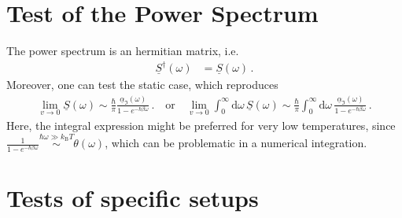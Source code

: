 \documentclass[11pt]{article}
\newcommand{\vv}[1]{\mathbf{#1}}
\newcommand{\dd}[0]{\mathrm{d}}
\begin{document}
\section{Test of the Power Spectrum}
The power spectrum is an hermitian matrix, i.e.
\begin{align}
\underline{S}^\dagger(\omega) &= \underline{S}(\omega)\,.
\end{align}
Moreover, one can test the static case, which reproduces
\begin{align}
  \lim_{v\to0}\underline{S}(\omega) \sim \frac{\hbar}{\pi}\frac{\underline{\alpha}_\Im(\omega)}{1-e^{-\hbar\beta\omega}}\,.
\quad\text{or} \quad
  \lim_{v\to0}\int_0^\infty\dd\omega\,\underline{S}(\omega) \sim \frac{\hbar}{\pi}\int_0^\infty\dd\omega\,\frac{\underline{\alpha}_\Im(\omega)}{1-e^{-\hbar\beta\omega}}\,.
\end{align}
Here, the integral expression might be preferred for very low temperatures, since $\frac{1}{1-e^{-\hbar\beta\omega}}\stackrel{\hbar\omega \gg k_\mathrm{B}T}\sim \theta(\omega)$, which can be problematic in a numerical integration.
\section{Tests of specific setups}
\end{document}
